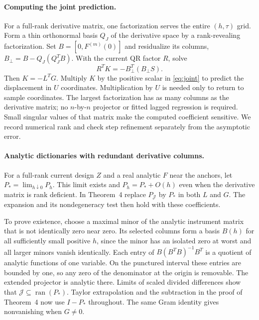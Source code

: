 \paragraph{Computing the joint prediction.}
For a full-rank derivative matrix, one factorization serves the entire $(h,\tau)$ grid. Form a thin orthonormal basis $Q_J$ of the derivative space by a rank-revealing factorization. Set $B=[0,F^{(m)}(0)]$ and residualize its columns, $B_\perp=B-Q_J(Q_J^TB)$. With the current QR factor $R$, solve
\[
 R^T K=-B_\perp^T(B_\perp S).
\]
Then $K=-L^TG$. Multiply $K$ by the positive scalar in \eqref{eq:joint} to predict the displacement in $U$ coordinates. Multiplication by $U$ is needed only to return to sample coordinates. The largest factorization has as many columns as the derivative matrix; no $n$-by-$n$ projector or fitted lagged regression is required. Small singular values of that matrix make the computed coefficient sensitive. We record numerical rank and check step refinement separately from the asymptotic error.

\paragraph{Analytic dictionaries with redundant derivative columns.}
For a full-rank current design $Z$ and a real analytic $F$ near the anchors, let $P_* = \lim_{h\downarrow0}P_h$. This limit exists and $P_h=P_*+O(h)$ even when the derivative matrix is rank deficient. In Theorem~4 replace $P_{\mathcal J}$ by $P_*$ in both $L$ and $G$. The expansion and its nondegeneracy test then hold with these coefficients.

To prove existence, choose a maximal minor of the analytic instrument matrix that is not identically zero near zero. Its selected columns form a basis $B(h)$ for all sufficiently small positive $h$, since the minor has an isolated zero at worst and all larger minors vanish identically. Each entry of $B(B^TB)^{-1}B^T$ is a quotient of analytic functions of one variable. On the punctured interval these entries are bounded by one, so any zero of the denominator at the origin is removable. The extended projector is analytic there. Limits of scaled divided differences show that $\mathcal J\subseteq\operatorname{ran}(P_*)$. Taylor extrapolation and the subtraction in the proof of Theorem~4 now use $I-P_*$ throughout. The same Gram identity gives nonvanishing when $G\ne0$.

